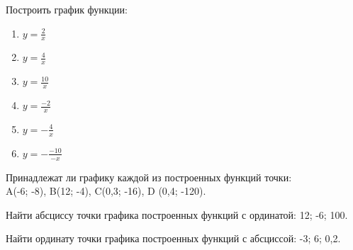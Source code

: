 \documentclass[algebra,twocolumn]{pum}
\begin{document}
\begin{exercises}
  \begin{question}
    Построить график функции:
    \begin{multicols}{2}
      \begin{enumerate}[label=\arabic*)]
      \item $y=\frac{2}{x}$
      \item $y=\frac{4}{x}$
      \item $y=\frac{10}{x}$
      \item $y=\frac{-2}{x}$
      \item $y=-\frac{4}{x}$
      \item $y=-\frac{-10}{-x}$
    \end{enumerate}
  \end{multicols}
\end{question}
\begin{question}
  Принадлежат ли графику каждой из построенных функций точки:\\
  A(-6; -8), B(12; -4), C(0,3; -16), D (0,4; -120). 
\end{question}
\begin{question}
  Найти абсциссу точки графика построенных функций с ординатой: 12; -6; 100.
\end{question}
\begin{question}
  Найти ординату точки графика построенных функций с абсциссой: -3; 6; 0,2.
\end{question}
\end{exercises}
\end{document}
